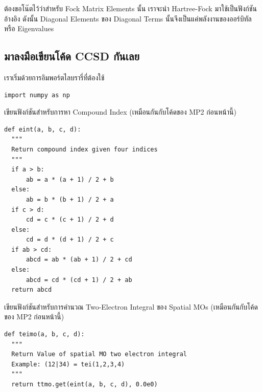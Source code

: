 ต้องขอโน๊ตไว้ว่าสำหรับ Fock Matrix Elements นั้น เราจะนำ Hartree-Fock มาใช้เป็นฟังก์ชันอ้างอิง ดังนั้น Diagonal Elements ของ Diagonal Terms นั้นจึงเป็นแค่พลังงานของออร์บิทัลหรือ Eigenvalues

\subsection{มาลงมือเขียนโค้ด CCSD กันเลย}

\vspace{5pt}

\noindent เราเริ่มด้วยการอิมพอร์ตไลบรารี่ที่ต้องใช้

\vspace{5pt}

\begin{lstlisting}[style=MyPython]
import numpy as np
\end{lstlisting}

\vspace{5pt}

\noindent เขียนฟังก์ชันสำหรับการหา Compound Index (เหมือนกันกับโค้ดของ MP2 ก่อนหน้านี้)

\vspace{5pt}

\begin{lstlisting}[style=MyPython]
def eint(a, b, c, d):
  """
  Return compound index given four indices
  """
  if a > b:
      ab = a * (a + 1) / 2 + b
  else:
      ab = b * (b + 1) / 2 + a
  if c > d:
      cd = c * (c + 1) / 2 + d
  else:
      cd = d * (d + 1) / 2 + c
  if ab > cd:
      abcd = ab * (ab + 1) / 2 + cd
  else:
      abcd = cd * (cd + 1) / 2 + ab
  return abcd
\end{lstlisting}

\vspace{5pt}

\noindent เขียนฟังก์ชันสำหรับการคำนวณ Two-Electron Integral ของ Spatial MOs (เหมือนกันกับโค้ดของ MP2 ก่อนหน้านี้)

\vspace{5pt}

\begin{lstlisting}[style=MyPython]
def teimo(a, b, c, d):
  """
  Return Value of spatial MO two electron integral
  Example: (12|34) = tei(1,2,3,4)
  """
  return ttmo.get(eint(a, b, c, d), 0.0e0)
\end{lstlisting}

\vspace{5pt}

